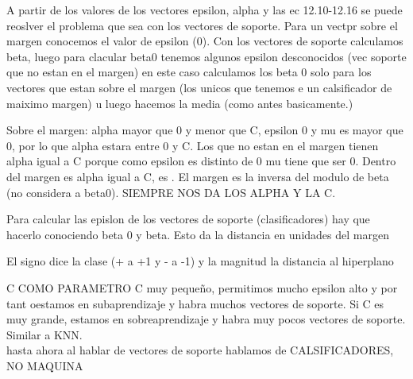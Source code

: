 A partir de los valores de los vectores epsilon, alpha y las ec 12.10-12.16 se puede reoslver el problema que sea con los vectores de soporte. Para un vectpr sobre el margen conocemos el valor de epsilon (0). Con los vectores de soporte calculamos beta, luego para clacular beta0 tenemos algunos epsilon desconocidos (vec soporte que no estan en el margen) en este caso calculamos los beta 0 solo para los vectores que estan sobre el margen (los unicos que tenemos e un calsificador de maiximo margen) u luego hacemos la media (como antes basicamente.)

Sobre el margen: alpha mayor que 0 y menor que C, epsilon 0 y mu es mayor que 0, por lo que alpha estara entre 0 y C. Los que no estan en el margen tienen alpha igual a C porque como epsilon es distinto de 0 mu tiene que ser 0. Dentro del margen es alpha igual a C, es . El margen es la inversa del modulo de beta (no considera a beta0). SIEMPRE NOS DA LOS ALPHA Y LA C.

Para calcular las epislon de los vectores de soporte (clasificadores) hay que hacerlo conociendo beta 0 y beta. Esto da la distancia en unidades del margen 


El signo dice la clase (+ a +1 y - a -1) y la magnitud la distancia al hiperplano



C COMO PARAMETRO
C muy pequeño, permitimos mucho epsilon alto y por tant oestamos en subaprendizaje y habra muchos vectores de soporte. Si C es muy grande, estamos en sobreaprendizaje y habra muy pocos vectores de soporte. Similar a KNN. \\



hasta ahora al hablar de vectores de soporte hablamos de CALSIFICADORES, NO MAQUINA